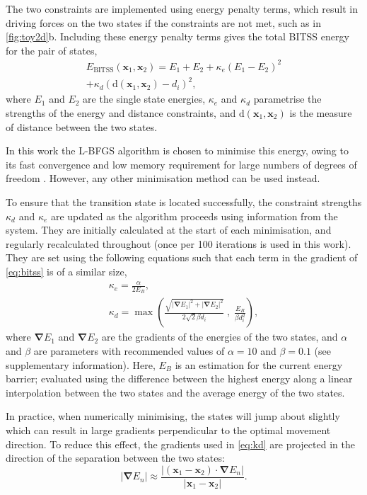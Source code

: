 \documentclass[twocolumn,10pt]{revtex4}
\newcommand{\abs}[1]{\left| #1 \right|}
\newcommand{\grad}{\bm{\nabla}}
\begin{document}
The two constraints are implemented using energy penalty terms, which result in driving forces on the two states if the constraints are not met, such as in \cref{fig:toy2d}b.
Including these energy penalty terms gives the total BITSS energy for the pair of states,
\begin{multline}\label{eq:bitss}
  E_\text{BITSS}(\bm{x}_1, \bm{x}_2) = E_1 + E_2
    + \kappa_e \left( E_1 - E_2 \right) ^2 \\
    + \kappa_d \left( \mathrm{d}(\bm{x}_1, \bm{x}_2) - d_i \right) ^2,
\end{multline}
where $E_1$ and $E_2$ are the single state energies, $\kappa_e$ and $\kappa_d$ parametrise the strengths of the energy and distance constraints, and $\mathrm{d}(\bm{x}_1, \bm{x}_2)$ is the measure of distance between the two states.

In this work the L-BFGS algorithm is chosen to minimise this energy, owing to its fast convergence and low memory requirement for large numbers of degrees of freedom \cite{Liu1989}.
However, any other minimisation method can be used instead.

To ensure that the transition state is located successfully, the constraint strengths $\kappa_d$ and $\kappa_e$ are updated as the algorithm proceeds using information from the system.
They are initially calculated at the start of each minimisation, and regularly recalculated throughout (once per 100 iterations is used in this work).
They are set using the following equations such that each term in the gradient of \cref{eq:bitss} is of a similar size,
\begin{gather}
  \kappa_e = \frac {\alpha} {2 E_B},
  \label{eq:ke}
  \\
  \kappa_d = \max \left(
    \frac {\sqrt{\abs{\grad E_1}^2 + \abs{\grad E_2}^2}} {2\sqrt{2} \beta d_i} \; , \;
    \frac{E_B}{\beta d_i^2} \right),
  \label{eq:kd}
\end{gather}
where $\grad E_1$ and $\grad E_2$ are the gradients of the energies of the two states, and $\alpha$ and $\beta$ are parameters with recommended values of $\alpha = 10$ and $\beta = 0.1$ (see supplementary information).
Here, $E_B$ is an estimation for the current energy barrier; evaluated using the difference between the highest energy along a linear interpolation between the two states and the average energy of the two states.

In practice, when numerically minimising, the states will jump about slightly which can result in large gradients perpendicular to the optimal movement direction.
To reduce this effect, the gradients used in \cref{eq:kd} are projected in the direction of the separation between the two states:
\begin{equation}
  \abs{\grad E_n} \approx \frac {\abs{(\bm{x}_1 - \bm{x}_2) \cdot \grad E_n}} {\abs{\bm{x}_1 - \bm{x}_2}}.
\end{equation}
\end{document}
